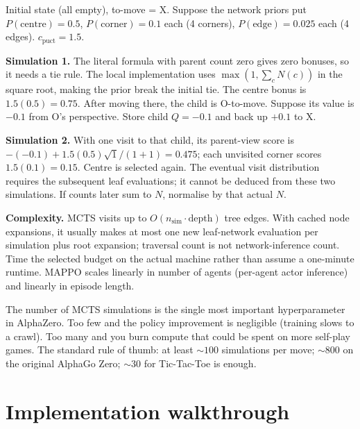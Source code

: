 \documentclass[11pt,oneside]{scrbook}
\begin{document}
\begin{example}
Initial state (all empty), to-move = X. Suppose the network priors put
$P(\text{centre}) = 0.5$, $P(\text{corner}) = 0.1$ each (4 corners),
$P(\text{edge}) = 0.025$ each (4 edges). $c_{\mathrm{puct}} = 1.5$.

\textbf{Simulation 1.} The literal formula with parent count zero gives
zero bonuses, so it needs a tie rule. The local implementation uses
$\max(1,\sum_cN(c))$ in the square root, making the prior break the
initial tie. The centre bonus is $1.5(0.5)=0.75$.
After moving there, the child is O-to-move. Suppose its value is $-0.1$
from O's perspective. Store child $Q=-0.1$ and back up $+0.1$ to X.

\textbf{Simulation 2.} With one visit to that child, its parent-view score is
$-(-0.1)+1.5(0.5)\sqrt1/(1+1)=0.475$; each unvisited corner scores
$1.5(0.1)=0.15$. Centre is selected again. The eventual visit distribution
requires the subsequent leaf evaluations; it cannot be deduced from these
two simulations. If counts later sum to $N$, normalise by that actual $N$.


\end{example}

\textbf{Complexity.} MCTS visits up to $O(n_{\mathrm{sim}}\cdot\text{depth})$
tree edges. With cached node expansions, it usually makes at most one
new leaf-network evaluation per simulation plus root expansion; traversal
count is not network-inference count. Time the selected budget on the
actual machine rather than assume a one-minute runtime.
MAPPO scales linearly in number of agents (per-agent actor inference) and
linearly in episode length.

\begin{pitfall}
The number of MCTS simulations is the single most important hyperparameter
in AlphaZero. Too few and the policy improvement is negligible (training
slows to a crawl). Too many and you burn compute that could be spent on
more self-play games. The standard rule of thumb: at least $\sim 100$
simulations per move; $\sim 800$ on the original AlphaGo Zero; $\sim 30$ for
Tic-Tac-Toe is enough.
\end{pitfall}

\chapter{Implementation walkthrough}
\end{document}
